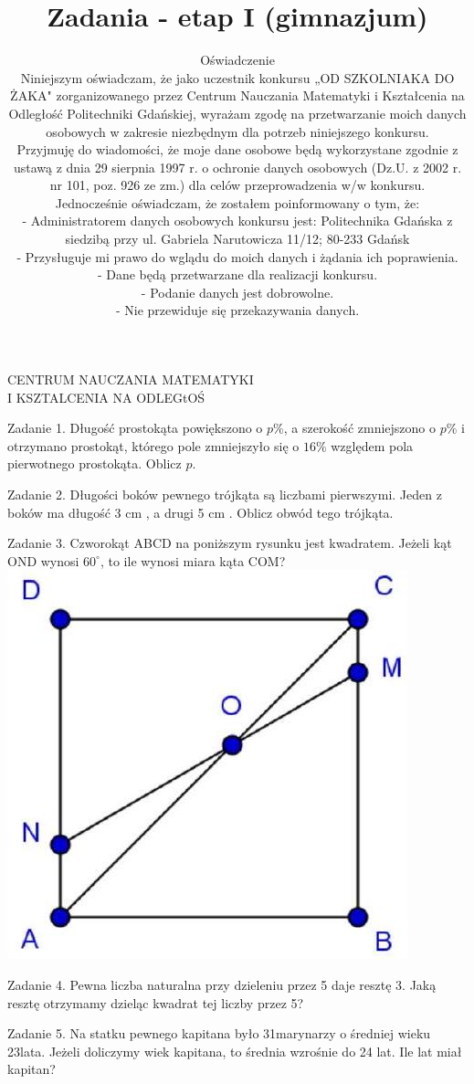 \documentclass[10pt]{article}
\title{Zadania - etap I (gimnazjum) }
\author{Oświadczenie\\
Niniejszym oświadczam, że jako uczestnik konkursu „OD SZKOLNIAKA DO ŻAKA" zorganizowanego przez Centrum Nauczania Matematyki i Kształcenia na Odległość Politechniki Gdańskiej, wyrażam zgodę na przetwarzanie moich danych osobowych w zakresie niezbędnym dla potrzeb niniejszego konkursu.\\
Przyjmuję do wiadomości, że moje dane osobowe będą wykorzystane zgodnie z ustawą z dnia 29 sierpnia 1997 r. o ochronie danych osobowych (Dz.U. z 2002 r. nr 101, poz. 926 ze zm.) dla celów przeprowadzenia w/w konkursu.\\
Jednocześnie oświadczam, że zostałem poinformowany o tym, że:\\
- Administratorem danych osobowych konkursu jest: Politechnika Gdańska z siedzibą przy ul. Gabriela Narutowicza 11/12; 80-233 Gdańsk\\
- Przysługuje mi prawo do wglądu do moich danych i żądania ich poprawienia.\\
- Dane będą przetwarzane dla realizacji konkursu.\\
- Podanie danych jest dobrowolne.\\
- Nie przewiduje się przekazywania danych.}
\date{}
\begin{document}
\maketitle
CENTRUM NAUCZANIA MATEMATYKI\\
I KSZTALCENIA NA ODLEGtOŚ

Zadanie 1. Długość prostokąta powiększono o \(p \%\), a szerokość zmniejszono o \(p \%\) i otrzymano prostokąt, którego pole zmniejszyło się o \(16 \%\) względem pola pierwotnego prostokąta. Oblicz \(p\).

Zadanie 2. Długości boków pewnego trójkąta są liczbami pierwszymi. Jeden z boków ma długość 3 cm , a drugi 5 cm . Oblicz obwód tego trójkąta.

Zadanie 3. Czworokąt ABCD na poniższym rysunku jest kwadratem. Jeżeli kąt OND wynosi \(60^{\circ}\), to ile wynosi miara kąta COM?\\
\includegraphics[max width=\textwidth, center]{2024_11_21_b612b1d0f88400ae5b9fg-1}

Zadanie 4. Pewna liczba naturalna przy dzieleniu przez 5 daje resztę 3. Jaką resztę otrzymamy dzieląc kwadrat tej liczby przez 5?

Zadanie 5. Na statku pewnego kapitana było 31marynarzy o średniej wieku 23lata. Jeżeli doliczymy wiek kapitana, to średnia wzrośnie do 24 lat. Ile lat miał kapitan?\\
\(\qquad\)
\end{document}
